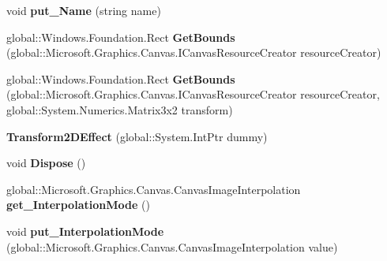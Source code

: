 \begin{DoxyCompactItemize}
void {\bfseries put\+\_\+\+Name} (string name)
\item 
\mbox{\label{class_microsoft_1_1_graphics_1_1_canvas_1_1_effects_1_1_transform2_d_effect_a639c1cb942d1e2f5df6eed9ed4630dda}} 
global\+::\+Windows.\+Foundation.\+Rect {\bfseries Get\+Bounds} (global\+::\+Microsoft.\+Graphics.\+Canvas.\+I\+Canvas\+Resource\+Creator resource\+Creator)
\item 
\mbox{\label{class_microsoft_1_1_graphics_1_1_canvas_1_1_effects_1_1_transform2_d_effect_ac6842a4b23389a0cf09a892e0a70cdd6}} 
global\+::\+Windows.\+Foundation.\+Rect {\bfseries Get\+Bounds} (global\+::\+Microsoft.\+Graphics.\+Canvas.\+I\+Canvas\+Resource\+Creator resource\+Creator, global\+::\+System.\+Numerics.\+Matrix3x2 transform)
\item 
\mbox{\label{class_microsoft_1_1_graphics_1_1_canvas_1_1_effects_1_1_transform2_d_effect_a3748c768254be919302047eede7038cd}} 
{\bfseries Transform2\+D\+Effect} (global\+::\+System.\+Int\+Ptr dummy)
\item 
\mbox{\label{class_microsoft_1_1_graphics_1_1_canvas_1_1_effects_1_1_transform2_d_effect_ac0a088ca93fab0d1da165143fccc2bf1}} 
void {\bfseries Dispose} ()
\item 
\mbox{\label{class_microsoft_1_1_graphics_1_1_canvas_1_1_effects_1_1_transform2_d_effect_a3e8f7b5eac9642f7b67f3051339ad6e0}} 
global\+::\+Microsoft.\+Graphics.\+Canvas.\+Canvas\+Image\+Interpolation {\bfseries get\+\_\+\+Interpolation\+Mode} ()
\item 
\mbox{\label{class_microsoft_1_1_graphics_1_1_canvas_1_1_effects_1_1_transform2_d_effect_a7f4454ee99f14f9f2a19f8f9a7faf9f5}} 
void {\bfseries put\+\_\+\+Interpolation\+Mode} (global\+::\+Microsoft.\+Graphics.\+Canvas.\+Canvas\+Image\+Interpolation value)
\item 
\mbox{\label{class_microsoft_1_1_graphics_1_1_canvas_1_1_effects_1_1_transform2_d_effect_aba647ac3b58290db44c3c98ca8c19749}} 

\end{DoxyCompactItemize}
